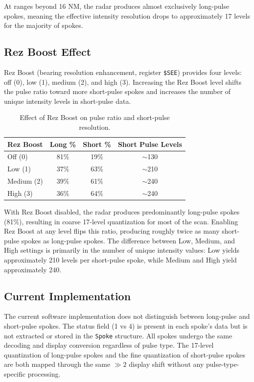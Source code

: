 \documentclass[11pt,letterpaper]{article}
\begin{document}
At ranges beyond 16 NM, the radar produces almost exclusively long-pulse spokes, meaning the effective intensity resolution drops to approximately 17 levels for the majority of spokes.

\subsection{Rez Boost Effect}

Rez Boost (bearing resolution enhancement, register \texttt{\$SEE}) provides four levels: off (0), low (1), medium (2), and high (3). Increasing the Rez Boost level shifts the pulse ratio toward more short-pulse spokes and increases the number of unique intensity levels in short-pulse data.

\begin{table}[H]
\centering
\caption{Effect of Rez Boost on pulse ratio and short-pulse resolution.}
\label{tab:rezboost}
\begin{tabular}{@{}lccc@{}}
\toprule
\textbf{Rez Boost} & \textbf{Long \%} & \textbf{Short \%} & \textbf{Short Pulse Levels} \\
\midrule
Off (0)    & 81\% & 19\% & $\sim$130 \\
Low (1)    & 37\% & 63\% & $\sim$210 \\
Medium (2) & 39\% & 61\% & $\sim$240 \\
High (3)   & 36\% & 64\% & $\sim$240 \\
\bottomrule
\end{tabular}
\end{table}

With Rez Boost disabled, the radar produces predominantly long-pulse spokes (81\%), resulting in coarse 17-level quantization for most of the scan. Enabling Rez Boost at any level flips this ratio, producing roughly twice as many short-pulse spokes as long-pulse spokes. The difference between Low, Medium, and High settings is primarily in the number of unique intensity values: Low yields approximately 210 levels per short-pulse spoke, while Medium and High yield approximately 240.

\subsection{Current Implementation}

The current software implementation does not distinguish between long-pulse and short-pulse spokes. The status field (1 vs 4) is present in each spoke's data but is not extracted or stored in the \texttt{Spoke} structure. All spokes undergo the same decoding and display conversion regardless of pulse type. The 17-level quantization of long-pulse spokes and the fine quantization of short-pulse spokes are both mapped through the same $\gg 2$ display shift without any pulse-type-specific processing.
\end{document}
